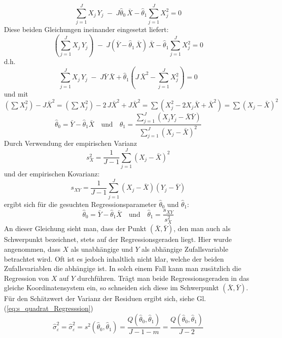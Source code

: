 \[
\sum\limits_{j = 1}^J {X_j \, Y_j \; - \; J \hat{\theta}_0 \, \bar {X}} - \hat{\theta}_1 \sum\limits_{j = 1}^J {X_j ^2 = 0}
\]
Diese beiden Gleichungen ineinander eingesetzt liefert:
\[
\left(\sum\limits_{j = 1}^J X_j \, Y_j\right) \; - 
\; J (\bar {Y} - \hat{\theta}_1 \, \bar {X}) \, \bar {X} - \hat{\theta}_1 \sum\limits_{j = 1}^J {X_j ^2 = 0}
\]
d.h.
\[
\sum\limits_{j = 1}^J X_j \, Y_j \; - \; J \bar {Y} \, \bar {X} + 
\hat{\theta}_1\left( J \, \bar {X}^2 - \sum\limits_{j = 1}^J X_j ^2 \right) = 0
\]
und mit $(\sum X_j^2) - J \bar X^2 = (\sum X_j^2) - 2 \, J \bar X^2  + J \bar X^2 = 
\sum(X_j^2 - 2 X_j \bar X  + \bar X^2) = \sum(X_j - \bar X)^2$
\[
\hat{\theta}_0 = \bar {Y} - \hat{\theta}_1 \bar {X} \quad \mathrm{und} \quad
\hat{\theta}_1 = \frac{\sum\limits_{j =
		1}^J {(X_j Y_j - \bar {X}\bar {Y})} }
{\sum\limits_{j = 1}^J {(X_j
		- \bar {X})^2} }
\]
Durch Verwendung der empirischen Varianz
\[
s_X^2 = \frac{1}{J - 1}\sum\limits_{j = 1}^J {(X_j - \bar {X})^2}
\]
\noindent und der empirischen Kovarianz:
\[
s_{XY} = \frac{1}{J - 1}\sum\limits_{j = 1}^J {(X_j - \bar
	{X})(Y_j - \bar {Y})}
\]
\noindent ergibt sich für die gesuchten Regressionsparameter
$\hat{\theta}_0$ und $\hat{\theta}_1 $:
\begin{equation}
\hat{\theta}_0 = \bar {Y} - \hat{\theta}_1 \bar {X} \quad \mathrm{und} \quad
\hat{\theta}_1 = \frac{s_{XY} }{s_X^2 }
\label{eq:Lineare_Regressionskonstanten}
\end{equation}
An dieser Gleichung sieht man, dass der Punkt $(\bar {X},\bar
{Y})$, den man auch als Schwerpunkt bezeichnet, stets auf der
Regressionsgeraden liegt. Hier wurde angenommen, dass $X$
als unabhängige und $Y $ als abhängige
Zufallsvariable betrachtet wird. Oft ist es jedoch inhaltlich
nicht klar, welche der beiden Zufallsvariablen die abh\"{a}ngige
ist. In solch einem Fall kann man zusätzlich die Regression
von $X$ auf $Y$ durchführen. Trägt man beide
Regressionsgeraden in das gleiche Koordinatensystem ein, so
schneiden sich diese im Schwerpunkt $(\bar {X},\bar {Y})$.
Für den Schätzwert der Varianz der Residuen ergibt sich, siehe Gl.(\ref{eq:s_quadrat_Regresssion})
\begin{equation}
\hat\sigma^2_\varepsilon = \hat\sigma_\varepsilon^2 = s^2(\hat{\theta}_0 ,\hat{\theta}_1 ) = \frac{Q(\hat{\theta}_0 ,
	\hat{\theta}_1 )}{J - 1 - m } 
= \frac{Q(\hat{\theta}_0 ,
	\hat{\theta}_1 )}{J - 2}
\end{equation}

\newpage
